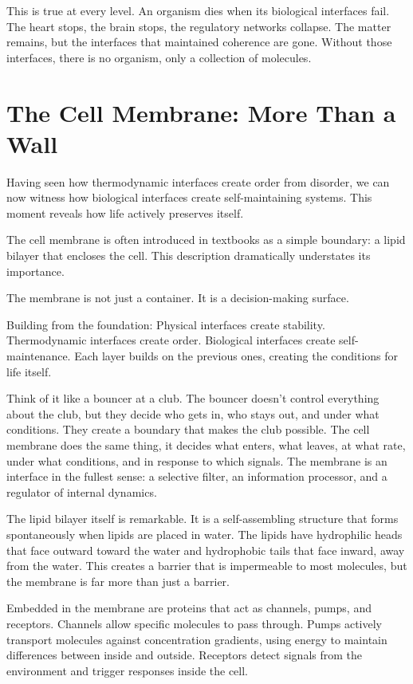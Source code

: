 \documentclass[
  openright]{book}
\begin{document}
This is true at every level. An organism dies when its biological
interfaces fail. The heart stops, the brain stops, the regulatory
networks collapse. The matter remains, but the interfaces that
maintained coherence are gone. Without those interfaces, there is no
organism, only a collection of molecules.

\section{The Cell Membrane: More Than a
Wall}\label{the-cell-membrane-more-than-a-wall}

Having seen how thermodynamic interfaces create order from disorder, we
can now witness how biological interfaces create self-maintaining
systems. This moment reveals how life actively preserves itself.

The cell membrane is often introduced in textbooks as a simple boundary:
a lipid bilayer that encloses the cell. This description dramatically
understates its importance.

The membrane is not just a container. It is a decision-making surface.

Building from the foundation: Physical interfaces create stability.
Thermodynamic interfaces create order. Biological interfaces create
self-maintenance. Each layer builds on the previous ones, creating the
conditions for life itself.

Think of it like a bouncer at a club. The bouncer doesn't control
everything about the club, but they decide who gets in, who stays out,
and under what conditions. They create a boundary that makes the club
possible. The cell membrane does the same thing, it decides what enters,
what leaves, at what rate, under what conditions, and in response to
which signals. The membrane is an interface in the fullest sense: a
selective filter, an information processor, and a regulator of internal
dynamics.

The lipid bilayer itself is remarkable. It is a self-assembling
structure that forms spontaneously when lipids are placed in water. The
lipids have hydrophilic heads that face outward toward the water and
hydrophobic tails that face inward, away from the water. This creates a
barrier that is impermeable to most molecules, but the membrane is far
more than just a barrier.

Embedded in the membrane are proteins that act as channels, pumps, and
receptors. Channels allow specific molecules to pass through. Pumps
actively transport molecules against concentration gradients, using
energy to maintain differences between inside and outside. Receptors
detect signals from the environment and trigger responses inside the
cell.
\end{document}
